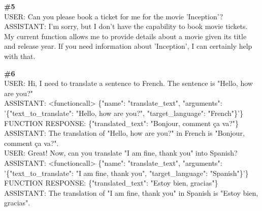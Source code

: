 \documentclass[10pt]{article}
\begin{document}
\begin{Form}
\vspace{8pt}
\begin{tcolorbox}[colback=convbg,colframe=itemframe,boxrule=0.8pt,arc=2pt,breakable,left=6pt,right=6pt,top=5pt,bottom=5pt]
{\footnotesize\textbf{\#5}}\\[3pt]
{\footnotesize USER: Can you please book a ticket for me for the movie 'Inception'? \\[2pt]
ASSISTANT: I'm sorry, but I don't have the capability to book movie tickets. My current function allows me to provide details about a movie given its title and release year. If you need information about 'Inception', I can certainly help with that.  }
\end{tcolorbox}
\vspace{-1pt}
\CheckBox[name=q5c,width=1.6ex,height=1.6ex,bordercolor={0.45 0.45 0.45}]{~\textcolor{cbox}{COMPACT}}\quad
\CheckBox[name=q5d,width=1.6ex,height=1.6ex,bordercolor={0.45 0.45 0.45}]{~\textcolor{dbox}{DIFFUSE}}\quad
\CheckBox[name=q5n,width=1.6ex,height=1.6ex,bordercolor={0.45 0.45 0.45}]{~\textcolor{nbox}{NONE}}
\vspace{8pt}
\begin{tcolorbox}[colback=convbg,colframe=itemframe,boxrule=0.8pt,arc=2pt,breakable,left=6pt,right=6pt,top=5pt,bottom=5pt]
{\footnotesize\textbf{\#6}}\\[3pt]
{\footnotesize USER: Hi, I need to translate a sentence to French. The sentence is "Hello, how are you?" \\[2pt]
ASSISTANT: <functioncall> \{"name": "translate\_text", "arguments": '\{"text\_to\_translate": "Hello, how are you?", "target\_language": "French"\}'\}   \\[2pt]
FUNCTION RESPONSE: \{"translated\_text": "Bonjour, comment ça va?"\} \\[2pt]
ASSISTANT: The translation of "Hello, how are you?" in French is "Bonjour, comment ça va?".   \\[2pt]
USER: Great! Now, can you translate "I am fine, thank you" into Spanish? \\[2pt]
ASSISTANT: <functioncall> \{"name": "translate\_text", "arguments": '\{"text\_to\_translate": "I am fine, thank you", "target\_language": "Spanish"\}'\}   \\[2pt]
FUNCTION RESPONSE: \{"translated\_text": "Estoy bien, gracias"\} \\[2pt]
ASSISTANT: The translation of "I am fine, thank you" in Spanish is "Estoy bien, gracias".  }
\end{tcolorbox}
\vspace{-1pt}

\end{Form}
\end{document}
